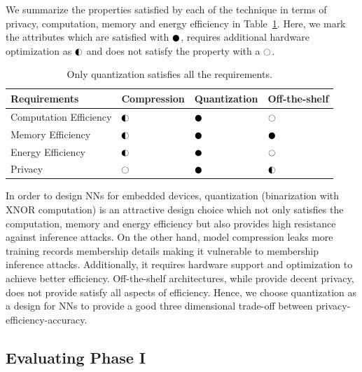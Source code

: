 We summarize the properties satisfied by each of the technique in terms of privacy, computation, memory and energy efficiency in Table~\ref{tbl:comparison}.
Here, we mark the attributes which are satisfied with $\cmark$, requires additional hardware optimization as $\smark$ and does not satisfy the property with a $\xmark$.

\begin{table}[!htb]
\begin{center}
\renewcommand\arraystretch{1.5}
\fontsize{6.7pt}{6.7pt}\selectfont
\begin{tabular}{|l||l|l|l|}
\hline
Requirements & Compression & Quantization & Off-the-shelf  \\
\hline
Computation Efficiency & $\smark$  & $\cmark$   & $\xmark$ \\
\hline
Memory Efficiency &  $\smark$ & $\cmark$   & $\cmark$ \\
\hline
Energy Efficiency &  $\smark$   & $\cmark$   & $\xmark$ \\
\hline
Privacy &  $\xmark$   & $\cmark$   & $\smark$ \\
\hline
\end{tabular}
\end{center}
\caption{Only quantization satisfies all the requirements.}
\label{tbl:comparison}
\end{table}

In order to design NNs for embedded devices, quantization (binarization with XNOR computation) is an attractive design choice which not only satisfies the computation, memory and energy efficiency but also provides high resistance against inference attacks.
On the other hand, model compression leaks more training records membership details making it vulnerable to membership inference attacks. Additionally, it requires hardware support and optimization to achieve better efficiency. Off-the-shelf architectures, while provide decent privacy, does not provide satisfy all aspects of efficiency.
Hence, we choose quantization as a design for NNs to provide a good three dimensional trade-off between privacy-efficiency-accuracy.






\subsection{Evaluating Phase I}


